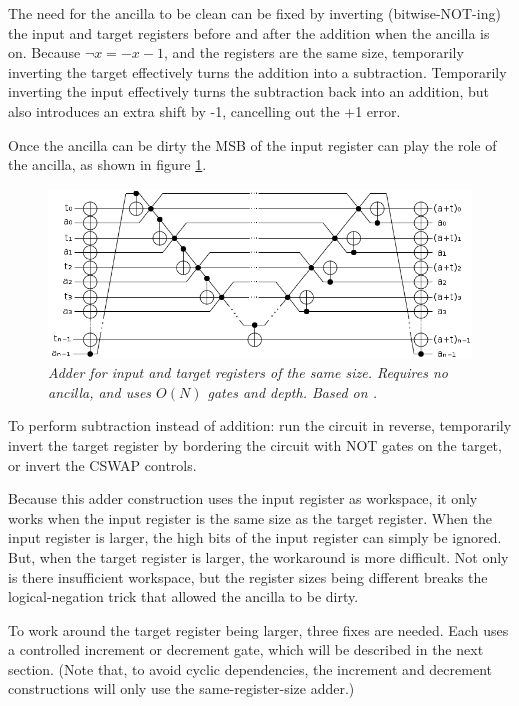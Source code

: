 \documentclass[twocolumn]{article}
\begin{document}
The need for the ancilla to be clean can be fixed by inverting (bitwise-NOT-ing) the input and target registers before and after the addition when the ancilla is on.
Because $\lnot x = -x-1$, and the registers are the same size, temporarily inverting the target effectively turns the addition into a subtraction.
Temporarily inverting the input effectively turns the subtraction back into an addition, but also introduces an extra shift by -1, cancelling out the +1 error.

Once the ancilla can be dirty the MSB of the input register can play the role of the ancilla, as shown in figure \ref{fig:inlineadder}.

\begin{figure}
  \centering
  \includegraphics[totalheight=3cm]{inline-adder.png}
  \caption{\em Adder for input and target registers of the same size.
  Requires no ancilla, and uses $O(N)$ gates and depth.
  Based on \cite{van2004, takahashi2005}.}
  \label{fig:inlineadder}
\end{figure}

To perform subtraction instead of addition: run the circuit in reverse, temporarily invert the target register by bordering the circuit with NOT gates on the target, or invert the CSWAP controls.

Because this adder construction uses the input register as workspace, it only works when the input register is the same size as the target register.
When the input register is larger, the high bits of the input register can simply be ignored.
But, when the target register is larger, the workaround is more difficult.
Not only is there insufficient workspace, but the register sizes being different breaks the logical-negation trick that allowed the ancilla to be dirty.

To work around the target register being larger, three fixes are needed.
Each uses a controlled increment or decrement gate, which will be described in the next section.
(Note that, to avoid cyclic dependencies, the increment and decrement constructions will only use the same-register-size adder.)
\end{document}

